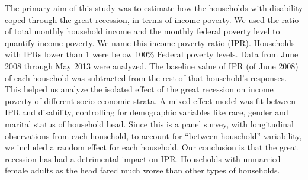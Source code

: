 \documentclass[11pt]{extarticle} %
\begin{document}
The primary aim of this study was to estimate how the households with disability coped through the great recession, in terms of income poverty. We used the ratio of total monthly household income and the monthly federal poverty level to quantify income poverty. We name this income poverty ratio (IPR).  Households with IPRs lower than 1 were below 100\% Federal poverty levels. Data from June 2008 through May 2013 were analyzed. The baseline value of IPR (of June 2008) of each household was subtracted from the rest of that household's responses. This helped us analyze the isolated effect of the great recession on income poverty of different socio-economic strata. A mixed effect model was fit between IPR and disability, controlling for demographic variables like race, gender and marital status of household head. Since this is a panel survey, with longitudinal observations from each household, to account for ``between household'' variability, we included a random effect for each household. Our conclusion is that the great recession has had a detrimental impact on IPR. Households with unmarried female adults as the head fared much worse than other types of households. 
\end{document}
